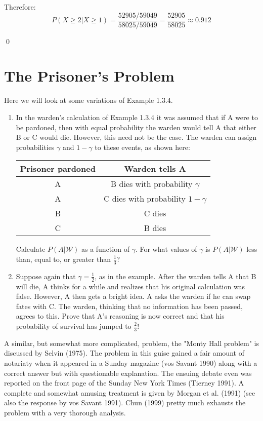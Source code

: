 Therefore:
\[ P(X \geq 2|X \geq 1) = \frac{52905/59049}{58025/59049} = \frac{52905}{58025} \approx 0.912 \]



\qed
\section{The Prisoner's Problem}

\begin{problembox}
Here we will look at some variations of Example 1.3.4.
\begin{enumerate}[label=(\alph*)]
    \item In the warden's calculation of Example 1.3.4 it was assumed that if A were to be pardoned, then with equal probability the warden would tell A that either B or C would die. However, this need not be the case. The warden can assign probabilities $\gamma$ and $1-\gamma$ to these events, as shown here:
    
    \begin{tabular}{|c|c|}
    \hline
    Prisoner pardoned & Warden tells A \\
    \hline
    A & B dies with probability $\gamma$ \\
    A & C dies with probability $1-\gamma$ \\
    B & C dies \\
    C & B dies \\
    \hline
    \end{tabular}
    
    Calculate $P(A|\mathcal{W})$ as a function of $\gamma$. For what values of $\gamma$ is $P(A|\mathcal{W})$ less than, equal to, or greater than $\frac{1}{3}$?
    
    \item Suppose again that $\gamma=\frac{1}{2}$, as in the example. After the warden tells A that B will die, A thinks for a while and realizes that his original calculation was false. However, A then gets a bright idea. A asks the warden if he can swap fates with C. The warden, thinking that no information has been passed, agrees to this. Prove that A's reasoning is now correct and that his probability of survival has jumped to $\frac{2}{3}$!
\end{enumerate}
A similar, but somewhat more complicated, problem, the "Monty Hall problem" is discussed by Selvin (1975). The problem in this guise gained a fair amount of notariaty when it appeared in a Sunday magazine (vos Savant 1990) along with a correct answer but with questionable explanation. The ensuing debate even was reported on the front page of the Sunday New York Times (Tierney 1991). A complete and somewhat amusing treatment is given by Morgan et al. (1991) (see also the response by vos Savant 1991). Chun (1999) pretty much exhausts the problem with a very thorough analysis.
\end{problembox}

